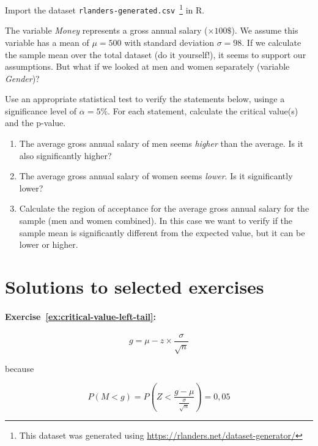\begin{exercise}
  \label{ex:z-test-rlanders}
  Import the dataset \texttt{rlanders-generated.csv}~\footnote{This dataset was generated using \url{https://rlanders.net/dataset-generator/}} in R.
  
  The variable \emph{Money} represents a gross annual salary ($\times 100\$$). We assume this variable has a mean of $\mu = 500$ with standard deviation $\sigma = 98$. If we calculate the sample mean over the total dataset (do it yourself!), it seems to support our assumptions. But what if we looked at men and women separately (variable \emph{Gender})?
  
  Use an appropriate statistical test to verify the statements below, usinge a significance level of $\alpha = 5\%$.
  For each statement, calculate the critical value(s) and the p-value.
  
  \begin{enumerate}
    \item The average gross annual salary of men seems \emph{higher} than the average. Is it also significantly higher?
    \item The average gross annual salary of women seems \emph{lower}. Is it significantly lower?
    \item Calculate the region of acceptance for the average gross annual salary for the sample (men and women combined). In this case we want to verify if the sample mean is significantly different from the expected value, but it can be lower or higher.
  \end{enumerate}
  
\end{exercise}

\section{Solutions to selected exercises}
\label{sec:testing-procedures-solutions}

\paragraph{Exercise~\ref{ex:critical-value-left-tail}:}

\begin{equation}
g = \mu - z \times \frac{\sigma}{\sqrt{n}}
\label{eq:kritiekeRechtseWaarde2}
\end{equation}

because

\[ P(M < g) = P\left(Z < \frac{g - \mu}{\frac{\sigma}{\sqrt{n}}}\right) = 0,05 \]

